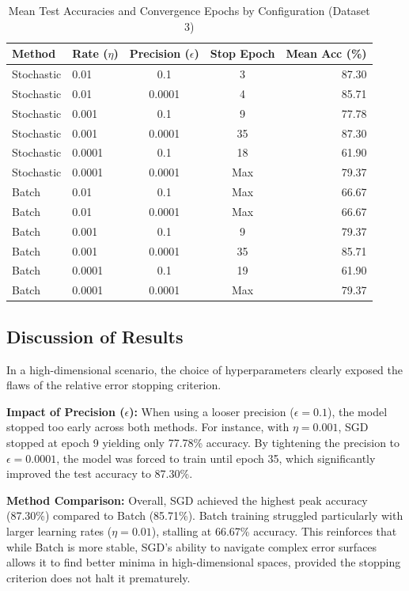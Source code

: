 \documentclass[12pt, a4paper]{article}
\begin{document}
\begin{table}[H]
\centering
\caption{Mean Test Accuracies and Convergence Epochs by Configuration (Dataset 3)}
\begin{tabular}{@{}llccr@{}}
\toprule
\textbf{Method} & \textbf{Rate ($\eta$)} & \textbf{Precision ($\epsilon$)} & \textbf{Stop Epoch} & \textbf{Mean Acc (\%)} \\ \midrule
Stochastic  & 0.01      & 0.1       & 3 & 87.30 \\
Stochastic  & 0.01      & 0.0001    & 4 & 85.71 \\
Stochastic  & 0.001     & 0.1       & 9 & 77.78 \\
Stochastic  & 0.001     & 0.0001    & 35 & 87.30 \\
Stochastic  & 0.0001    & 0.1       & 18 & 61.90 \\
Stochastic  & 0.0001    & 0.0001    & Max & 79.37 \\ \midrule
Batch       & 0.01      & 0.1       & Max & 66.67 \\
Batch       & 0.01      & 0.0001    & Max & 66.67 \\
Batch       & 0.001     & 0.1       & 9 & 79.37 \\
Batch       & 0.001     & 0.0001    & 35 & 85.71 \\
Batch       & 0.0001    & 0.1       & 19 & 61.90 \\
Batch       & 0.0001    & 0.0001    & Max & 79.37 \\ \bottomrule
\end{tabular}
\end{table}

\subsection{Discussion of Results}
In a high-dimensional scenario, the choice of hyperparameters clearly exposed the flaws of the relative error stopping criterion.

\textbf{Impact of Precision ($\epsilon$):} When using a looser precision ($\epsilon = 0.1$), the model stopped too early across both methods. For instance, with $\eta = 0.001$, SGD stopped at epoch 9 yielding only 77.78\% accuracy. By tightening the precision to $\epsilon = 0.0001$, the model was forced to train until epoch 35, which significantly improved the test accuracy to 87.30\%. 

\textbf{Method Comparison:} Overall, SGD achieved the highest peak accuracy (87.30\%) compared to Batch (85.71\%). Batch training struggled particularly with larger learning rates ($\eta = 0.01$), stalling at 66.67\% accuracy. This reinforces that while Batch is more stable, SGD's ability to navigate complex error surfaces allows it to find better minima in high-dimensional spaces, provided the stopping criterion does not halt it prematurely.
\end{document}
